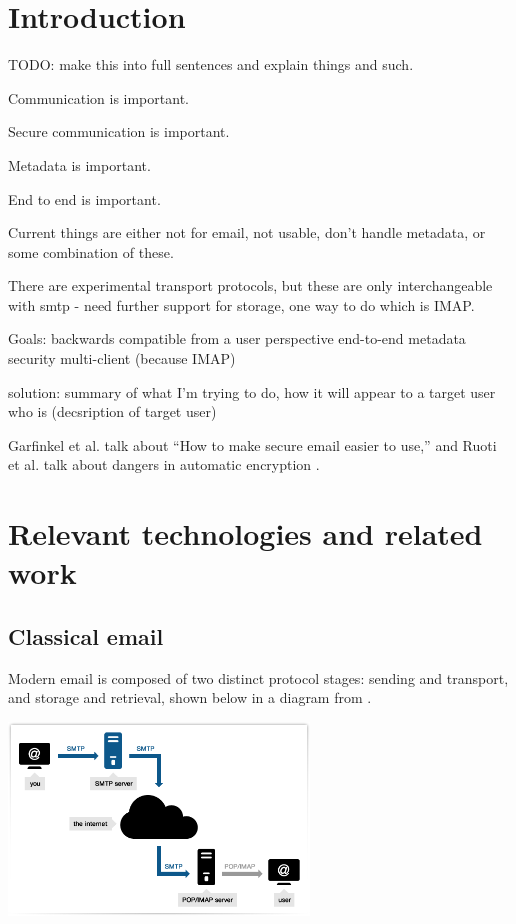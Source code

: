 \documentclass[pageno]{jpaper}
\begin{document}
\newpage

\tableofcontents

\newpage

\section{Introduction}


TODO: make this into full sentences and explain things and such.

Communication is important.

Secure communication is important.

Metadata is important.

End to end is important.

Current things are either not for email, not usable, don't handle metadata, or some combination of these.

There are experimental transport protocols, but these are only interchangeable with smtp - need further support for storage, one way to do which is IMAP.


Goals:
backwards compatible from a user perspective
end-to-end metadata security
multi-client (because IMAP)

solution: summary of what I'm trying to do, how it will appear to a target user who is (decsription of target user)

Garfinkel et al. \cite{garfinkel} talk about ``How to make secure email easier to use,'' and Ruoti et al. talk about dangers in automatic encryption \cite{ruoti}.

\section{Relevant technologies and related work}

\subsection{Classical email}
Modern email is composed of two distinct protocol stages: sending and transport, and storage and retrieval, shown below in a diagram from \cite{smtp_imap}.

\begin{center}
\includegraphics[width=0.6\textwidth]{smtp_imap}
\end{center}
\end{document}
